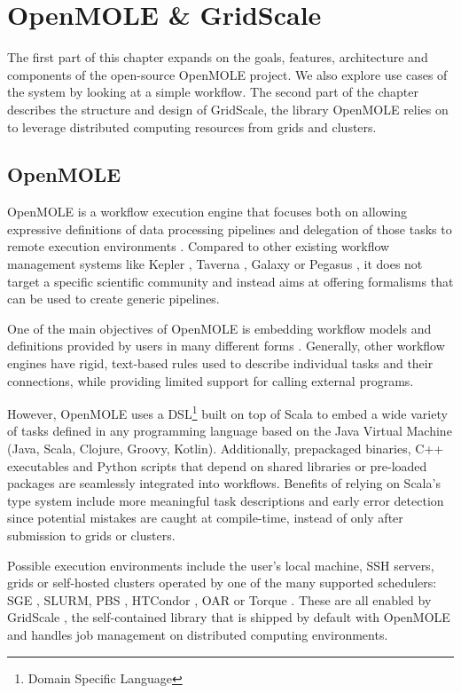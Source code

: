 \chapter{OpenMOLE \& GridScale} \label{DesignChapter}

The first part of this chapter expands on the goals, features, architecture and components of the open-source OpenMOLE project. We also explore use cases of the system by looking at a simple workflow. The second part of the chapter describes the structure and design of GridScale, the library OpenMOLE relies on to leverage distributed computing resources from grids and clusters.

\section{OpenMOLE}

OpenMOLE\cite{OpenMOLE} is a workflow execution engine that focuses both on allowing expressive definitions of data processing pipelines and delegation of those tasks to remote execution environments \cite{Leclaire2016}. Compared to other existing workflow management systems like Kepler \cite{Kepler}, Taverna \cite{Taverna}, Galaxy \cite{Galaxy} or Pegasus \cite{Pegasus}, it does not target a specific scientific community and instead aims at offering formalisms that can be used to create generic pipelines.

One of the main objectives of OpenMOLE is embedding workflow models and definitions provided by users in many different forms \cite{Reuillon2013}. Generally, other workflow engines have rigid, text-based rules used to describe individual tasks and their connections, while providing limited support for calling external programs. 

However, OpenMOLE uses a DSL\footnote{Domain Specific Language} built on top of Scala\cite{Scala} to embed a wide variety of tasks defined in any programming language based on the Java Virtual Machine (Java, Scala, Clojure, Groovy, Kotlin). Additionally, prepackaged binaries, C++ executables and Python scripts that depend on shared libraries or pre-loaded packages are seamlessly integrated into workflows. Benefits of relying on Scala's type system include more meaningful task descriptions and early error detection since potential mistakes are caught at compile-time, instead of only after submission to grids or clusters.

Possible execution environments include the user's local machine, SSH servers, grids or self-hosted clusters operated by one of the many supported schedulers: SGE \cite{SGE}, SLURM, PBS \cite{PBS}, HTCondor \cite{HTCondor}, OAR \cite{OAR} or Torque \cite{Torque}. These are all enabled by GridScale \cite{Reuillon2016}, the self-contained library that is shipped by default with OpenMOLE and handles job management on distributed computing environments.

